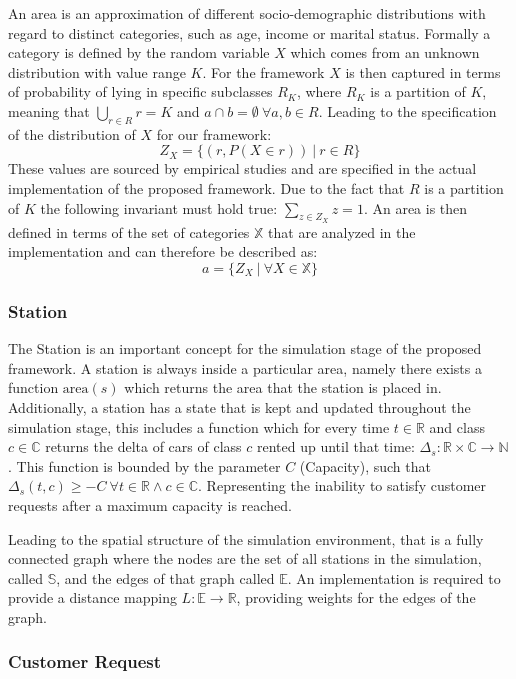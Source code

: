An area is an approximation of different socio-demographic distributions with regard to 
distinct categories, such as age, income or marital status. Formally a category is defined by the random variable $X$ which
comes from an unknown distribution with value range $K$. For the framework $X$ is then
captured in terms of probability of lying in specific
subclasses $R_K$, where $R_K$ is a partition of $K$, meaning that
$\bigcup_{r \in R} r = K$ and $a \cap b = \emptyset \ \forall a, b \in R$. Leading to the
specification of the distribution of $X$ for our framework:
$$
Z_X = \{ (r, P(X \in r)) \ |\ r \in R \}
$$
These values are sourced by empirical studies and are specified in the actual implementation
of the proposed framework.
Due to the fact that $R$ is a partition of $K$ the following invariant must hold true: $\sum_{z \in Z_X} z = 1$.
An area is then defined in terms of the set of categories $\mathbb{X}$ that are analyzed in the implementation 
and can therefore be described as:
$$
a = \{ Z_X \ | \ \forall X \in \mathbb{X} \}
$$

\subsubsection{Station}
\label{sub_sec:Method/Concepts/Station}

The Station is an important concept for the simulation stage of the proposed framework. A station is always
inside a particular area, namely there exists a function $\text{area}(s)$ which returns the area that the 
station is placed in. Additionally, a station has a state that is kept and updated throughout the simulation
stage, this includes a function which for every time $t \in \mathbb{R}$ and class $c \in \mathbb{C}$ returns
the delta of cars of class $c$ rented up until that time: $\Delta_s: \mathbb{R} \times \mathbb{C} \to \mathbb{N}$. This function
is bounded by the parameter $C$ (Capacity), such that $\Delta_s(t, c) \ge -C \ \forall t \in \mathbb{R} \land c \in \mathbb{C}$.
Representing the inability to satisfy customer requests after a maximum capacity is reached.

Leading to the spatial structure of the simulation environment, that is a fully connected graph where the nodes are 
the set of all stations in the simulation, called $\mathbb{S}$, and the edges of that graph called $\mathbb{E}$. An implementation
is required to provide a distance mapping $L: \mathbb{E} \to \mathbb{R}$, providing weights for the edges of the graph.

\subsubsection{Customer Request}
\label{sub_sec:Method/Concepts/Request}

